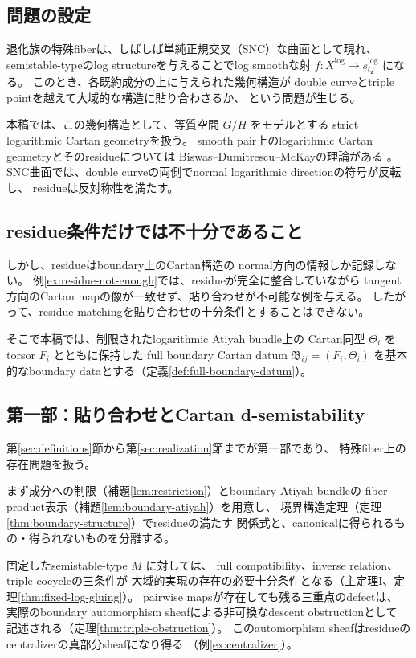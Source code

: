 \documentclass[uplatex,dvipdfmx,11pt]{jsarticle}
\numberwithin{equation}{section}
\theoremstyle{plain}
\theoremstyle{definition}
\theoremstyle{remark}
\newcommand{\sQ}{s_Q^{\log}}
\newcommand{\Xlog}{X^{\log}}
\newcommand{\calB}{\mathfrak B}
\begin{document}
\subsection*{問題の設定}

退化族の特殊fiberは、しばしば単純正規交叉（SNC）な曲面として現れ、
semistable-typeのlog structureを与えることでlog smoothな射
\(f:\Xlog\to\sQ\) になる。
このとき、各既約成分の上に与えられた幾何構造が
double curveとtriple pointを越えて大域的な構造に貼り合わさるか、
という問題が生じる。

本稿では、この幾何構造として、等質空間 \(G/H\) をモデルとする
strict logarithmic Cartan geometryを扱う。
smooth pair上のlogarithmic Cartan geometryとそのresidueについては
Biswas--Dumitrescu--McKayの理論がある \cite{BDM}。
SNC曲面では、double curveの両側でnormal logarithmic directionの符号が反転し、
residueは反対称性を満たす。

\subsection*{residue条件だけでは不十分であること}

しかし、residueはboundary上のCartan構造の
normal方向の情報しか記録しない。
例\ref{ex:residue-not-enough}では、residueが完全に整合していながら
tangent方向のCartan mapの像が一致せず、貼り合わせが不可能な例を与える。
したがって、residue matchingを貼り合わせの十分条件とすることはできない。

そこで本稿では、制限されたlogarithmic Atiyah bundle上の
Cartan同型 \(\Theta_i\) をtorsor \(F_i\) とともに保持した
full boundary Cartan datum \(\calB_{ij}=(F_i,\Theta_i)\)
を基本的なboundary dataとする（定義\ref{def:full-boundary-datum}）。

\subsection*{第一部：貼り合わせとCartan d-semistability}

第\ref{sec:definitions}節から第\ref{sec:realization}節までが第一部であり、
特殊fiber上の存在問題を扱う。

まず成分への制限（補題\ref{lem:restriction}）とboundary Atiyah bundleの
fiber product表示（補題\ref{lem:boundary-atiyah}）を用意し、
境界構造定理（定理\ref{thm:boundary-structure}）でresidueの満たす
関係式と、canonicalに得られるもの・得られないものを分離する。

固定したsemistable-type \(M\) に対しては、
full compatibility、inverse relation、triple cocycleの三条件が
大域的実現の存在の必要十分条件となる（主定理I、定理\ref{thm:fixed-log-gluing}）。
pairwise mapsが存在しても残る三重点のdefectは、
実際のboundary automorphism sheafによる非可換なdescent obstructionとして
記述される（定理\ref{thm:triple-obstruction}）。
このautomorphism sheafはresidueのcentralizerの真部分sheafになり得る
（例\ref{ex:centralizer}）。
\end{document}
